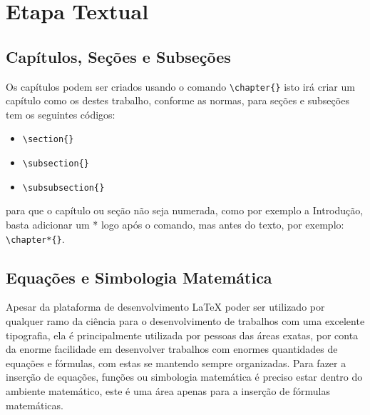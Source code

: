 \chapter{Etapa Textual}
\section{Capítulos, Seções e Subseções}

Os capítulos podem ser criados usando o comando \lstinline|\chapter{}| isto irá criar um capítulo como os destes trabalho, conforme as normas, para seções e subseções tem os seguintes códigos:
\begin{itemize}
	\item \lstinline|\section{}|
	\item \lstinline|\subsection{}|
	\item \lstinline|\subsubsection{}|
\end{itemize}

para que o capítulo ou seção não seja numerada, como por exemplo a Introdução, basta adicionar um * logo após o comando, mas antes do texto, por exemplo: \lstinline|\chapter*{}|.

\section{Equações e Simbologia Matemática}
Apesar da plataforma de desenvolvimento LaTeX poder ser utilizado por qualquer ramo da ciência para o desenvolvimento de trabalhos com uma excelente tipografia, ela é principalmente utilizada por pessoas das áreas exatas, por conta da enorme facilidade em desenvolver trabalhos com enormes quantidades de equações e fórmulas, com estas se mantendo sempre organizadas. Para fazer a inserção de equações, funções ou simbologia matemática é preciso estar dentro do ambiente matemático, este é uma área apenas para a inserção de fórmulas matemáticas. 

